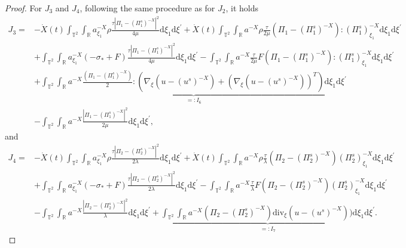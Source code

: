 \documentclass[10pt,reqno]{amsart}
\numberwithin{equation}{section}
\newcommand{\dif}{\mathrm{d}}
\newcommand{\ddiv}{\mathrm{div}}
\begin{document}
\begin{proof}
For $J_3$ and $J_4$, following the same procedure as for $J_2$, it holds
\begin{equation}\label{0j3}
\begin{aligned}
J_3=&-\dot{X}(t)\int_{\mathbb{T}^2}\int_{\mathbb{R}}a^{-X}_{\xi_1}\rho \frac{\tau|\Pi_1-(\Pi_1^s)^{-X}|^2}{4\mu}\dif \xi_1\dif \xi^{\prime}
+\dot{X}(t)\int_{\mathbb{T}^2}\int_{\mathbb{R}}a^{-X}\rho \frac{\tau}{2\mu}\left(\Pi_1-(\Pi_1^s)^{-X}\right):(\Pi_1^s)^{-X}_{\xi_1}\dif \xi_1\dif \xi^{\prime}\\
&+\int_{\mathbb{T}^2}\int_{\mathbb{R}}a^{-X}_{\xi_1}(-\sigma_\ast+F) \frac{\tau|\Pi_1-(\Pi_1^s)^{-X}|^2}{4\mu}\dif \xi_1\dif \xi^{\prime}
-\int_{\mathbb{T}^2}\int_{\mathbb{R}}a^{-X}\frac{\tau}{2\mu}F\left(\Pi_1-(\Pi_1^s)^{-X}\right):(\Pi_1^s)^{-X}_{\xi_1}\dif \xi_1\dif \xi^{\prime}\\
&+\underbrace{\int_{\mathbb{T}^2}\int_{\mathbb{R}}a^{-X}\frac{\left(\Pi_1-(\Pi_1^s)^{-X}\right)}{2}
:\left(\nabla_\xi\left(u-(u^s)^{-X}\right)
+\left(\nabla_\xi\left(u-(u^s)^{-X}\right)\right)^T\right)\dif \xi_1\dif \xi^{\prime}}\limits_{=:I_6}\\
&-\int_{\mathbb{T}^2}\int_{\mathbb{R}}a^{-X}\frac{|\Pi_1-(\Pi_1^s)^{-X}|^2}{2\mu}\dif \xi_1\dif \xi^{\prime},
\end{aligned}
\end{equation}
and
\begin{equation}\label{0j4}
\begin{aligned}
J_4=&-\dot{X}(t)\int_{\mathbb{T}^2}\int_{\mathbb{R}}a^{-X}_{\xi_1}\rho \frac{\tau|\Pi_2-(\Pi_2^s)^{-X}|^2}{2\lambda}\dif \xi_1\dif \xi^{\prime}
+\dot{X}(t)\int_{\mathbb{T}^2}\int_{\mathbb{R}}a^{-X}\rho \frac{\tau}{\lambda}\left(\Pi_2-(\Pi_2^s)^{-X}\right)(\Pi_2^s)^{-X}_{\xi_1}\dif \xi_1\dif \xi^{\prime}\\
&+\int_{\mathbb{T}^2}\int_{\mathbb{R}}a^{-X}_{\xi_1}(-\sigma_\ast+F) \frac{\tau|\Pi_2-(\Pi_2^s)^{-X}|^2}{2\lambda}\dif \xi_1\dif \xi^{\prime}
-\int_{\mathbb{T}^2}\int_{\mathbb{R}}a^{-X}\frac{\tau}{\lambda}F\left(\Pi_2-(\Pi_2^s)^{-X}\right)(\Pi_2^s)^{-X}_{\xi_1}\dif \xi_1\dif \xi^{\prime}\\
&-\int_{\mathbb{T}^2}\int_{\mathbb{R}}a^{-X}\frac{|\Pi_2-(\Pi_2^s)^{-X}|^2}{\lambda}\dif \xi_1\dif \xi^{\prime}
+\underbrace{\int_{\mathbb{T}^2}\int_{\mathbb{R}}a^{-X}\left(\Pi_2-(\Pi_2^s)^{-X}\right)
\ddiv_\xi\left(u-(u^s)^{-X}\right))\dif \xi_1\dif \xi^{\prime}}\limits_{=:I_7}.
\end{aligned}
\end{equation}


\end{proof}
\end{document}

